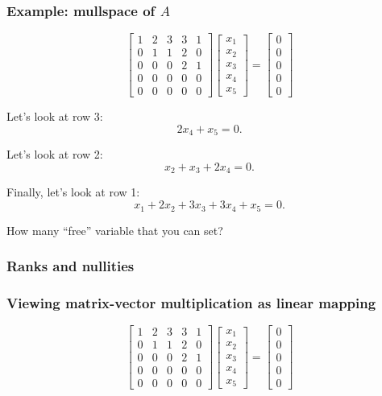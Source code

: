\begin{frame}
  \frametitle{Example: mullspace of $A$}

  {\footnotesize
    \[
    \begin{bmatrix}
      1 & 2 & 3 & 3 & 1 \\
      0 & 1 & 1 & 2 & 0 \\
      0 & 0 & 0 & 2 & 1 \\
      0 & 0 & 0 & 0 & 0 \\
      0 & 0 & 0 & 0 & 0 
    \end{bmatrix}
    \begin{bmatrix}
      x_1 \\ x_2 \\ x_3 \\ x_4 \\ x_5
    \end{bmatrix}
    =
    \begin{bmatrix}
      0 \\ 0 \\ 0 \\ 0 \\ 0
    \end{bmatrix}
    \]
  }
  \vspace{0.2in}
  
  \pause
  Let's look at row 3:
  \[
  2x_4 + x_5 = 0.
  \]

  \pause
  Let's look at row 2:
  \[
  x_2 + x_3 + 2x_4 = 0.
  \]

  \pause
  Finally, let's look at row 1:
  \[
  x_1 + 2x_2 + 3x_3 + 3x_4 + x_5 = 0.
  \]

  \pause
  How many ``free'' variable that you can set?
  
\end{frame}

\begin{frame}
  \frametitle{Ranks and nullities}
\end{frame}

\begin{frame}
  \frametitle{Viewing matrix-vector multiplication as linear mapping}
  {\footnotesize
    \[
    \begin{bmatrix}
      1 & 2 & 3 & 3 & 1 \\
      0 & 1 & 1 & 2 & 0 \\
      0 & 0 & 0 & 2 & 1 \\
      0 & 0 & 0 & 0 & 0 \\
      0 & 0 & 0 & 0 & 0 
    \end{bmatrix}
    \begin{bmatrix}
      x_1 \\ x_2 \\ x_3 \\ x_4 \\ x_5
    \end{bmatrix}
    =
    \begin{bmatrix}
      0 \\ 0 \\ 0 \\ 0 \\ 0
    \end{bmatrix}
    \]
  }
  \vspace{2in}
\end{frame}

